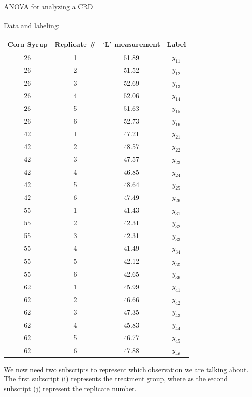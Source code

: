 \newpage

\Large ANOVA for analyzing a CRD \normalsize\\~\\
Data and labeling:  
\begin{center}
\begin{tabular}{cc|cc}
Corn Syrup & Replicate \# & `L' measurement  & Label\\\hline
26 &1& 51.89&$y_{11}$\\
26 &2& 51.52&$y_{12}$\\
26 &3& 52.69&$y_{13}$\\
26 &4& 52.06&$y_{14}$\\
26 &5& 51.63&$y_{15}$\\
26 &6& 52.73&$y_{16}$\\
42 &1& 47.21&$y_{21}$\\
42 &2& 48.57&$y_{22}$\\
42 &3& 47.57&$y_{23}$\\
42 &4& 46.85&$y_{24}$\\
42 &5& 48.64&$y_{25}$\\
42 &6& 47.49&$y_{26}$\\
55 &1& 41.43&$y_{31}$\\
55& 2& 42.31&$y_{32}$\\
55& 3& 42.31&$y_{33}$\\
55& 4& 41.49&$y_{34}$\\
55& 5& 42.12&$y_{35}$\\
55& 6& 42.65&$y_{36}$\\
62 &1& 45.99&$y_{41}$\\
62 &2& 46.66&$y_{42}$\\
62 &3& 47.35&$y_{43}$\\
62 &4& 45.83&$y_{44}$\\
62 &5& 46.77&$y_{45}$\\
62 &6& 47.88&$y_{46}$\\
\end{tabular}
\end{center}

We now need two subscripts to represent which observation we are talking about. The first subscript (i) represents the treatment group, where as the second subscript (j) represent the replicate number.\\~\\

